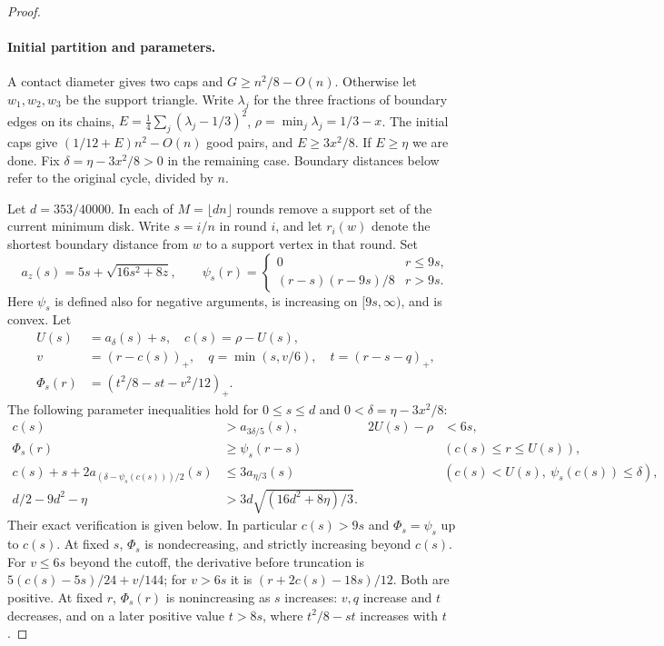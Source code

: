 \begin{proof}
\paragraph{Initial partition and parameters.}
A contact diameter gives two caps and \(G\ge n^2/8-O(n)\). Otherwise let \(w_1,w_2,w_3\) be the support triangle. Write \(\lambda_j\) for the three fractions of boundary edges on its chains, \(E=\frac14\sum_j(\lambda_j-1/3)^2\), \(\rho=\min_j\lambda_j=1/3-x\). The initial caps give \((1/12+E)n^2-O(n)\) good pairs, and \(E\ge3x^2/8\). If \(E\ge\eta\) we are done. Fix \(\delta=\eta-3x^2/8>0\) in the remaining case. Boundary distances below refer to the original cycle, divided by \(n\).

Let \(d=353/40000\). In each of \(M=\lfloor dn\rfloor\) rounds remove a support set of the current minimum disk. Write \(s=i/n\) in round \(i\), and let \(r_i(w)\) denote the shortest boundary distance from \(w\) to a support vertex in that round. Set
\[
 a_z(s)=5s+\sqrt{16s^2+8z},\qquad
 \psi_s(r)=
 \begin{cases}
 0 & r\le9s,\\
 (r-s)(r-9s)/8 & r>9s.
 \end{cases}
\]
Here \(\psi_s\) is defined also for negative arguments, is increasing on \([9s,\infty)\), and is convex. Let
\[
 \begin{split}
 U(s)&=a_\delta(s)+s,\quad c(s)=\rho-U(s),\\
 v&=(r-c(s))_+,\quad q=\min(s,v/6),\quad t=(r-s-q)_+,\\
 \Phi_s(r)&=(t^2/8-st-v^2/12)_+ .
 \end{split}
\]
The following parameter inequalities hold for \(0\le s\le d\) and \(0<\delta=\eta-3x^2/8\):
\begin{align}
 c(s)&>a_{3\delta/5}(s), & 2U(s)-\rho&<6s, \label{eq:params}\\
 \Phi_s(r)&\ge\psi_s(r-s) &&(c(s)\le r\le U(s)), \label{eq:shift}\\
 c(s)+s+2a_{(\delta-\psi_s(c(s)))/2}(s)&\le3a_{\eta/3}(s)
 &&(c(s)<U(s),\ \psi_s(c(s))\le\delta), \label{eq:sum}\\
 d/2-9d^2-\eta&>3d\sqrt{(16d^2+8\eta)/3}. \label{eq:integral}
\end{align}
Their exact verification is given below. In particular \(c(s)>9s\) and \(\Phi_s=\psi_s\) up to \(c(s)\). At fixed \(s\), \(\Phi_s\) is nondecreasing, and strictly increasing beyond \(c(s)\). For \(v\le6s\) beyond the cutoff, the derivative before truncation is \(5(c(s)-5s)/24+v/144\); for \(v>6s\) it is \((r+2c(s)-18s)/12\). Both are positive. At fixed \(r\), \(\Phi_s(r)\) is nonincreasing as \(s\) increases: \(v,q\) increase and \(t\) decreases, and on a later positive value \(t>8s\), where \(t^2/8-st\) increases with \(t\).


\end{proof}
